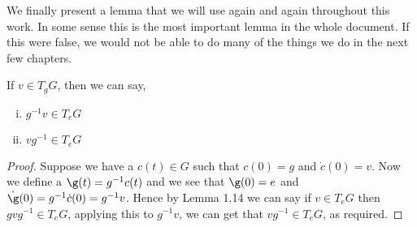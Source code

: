 \noindent
We finally present a lemma that we will use again and again throughout this work. In some sense this is the most important lemma in the whole document. If this were false, we would not be able to do many of the things we do in the next few chapters.
\begin{nlemma}
  If $v \in T_gG$, then we can say,
  \begin{enumerate}[(i)]
    \item $g^{-1}v \in T_eG$
    \item $vg^{-1} \in T_eG$
  \end{enumerate}
\end{nlemma}
{\begin{proof}
  Suppose we have a $c(t) \in G$ such that $c(0) = g$ and $\dot c(0) = v$. Now we define a $\g(t) = g^{-1}c(t)$ and we see that $\g (0) = e$ and $\dot\g(0) = g^{-1}\dot c(0) = g^{-1}v$. Hence by Lemma 1.14 we can say if $v \in T_eG$ then $gvg^{-1} \in T_eG$, applying this to $g^{-1}v$, we can get that $vg^{-1} \in T_eG$, as required.
\end{proof} }
